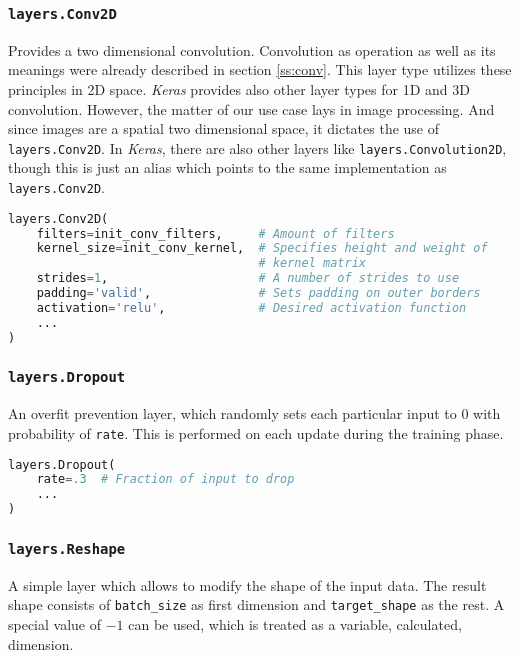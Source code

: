 \subsubsection{\texttt{layers.Conv2D}}

Provides a two dimensional convolution. Convolution as operation as well as its meanings were already described in section \ref{ss:conv}. This layer type utilizes these principles in 2D space. \textit{Keras} provides also other layer types for 1D and 3D convolution. However, the matter of our use case lays in image processing. And since images are a spatial two dimensional space, it dictates the use of \texttt{layers.Conv2D}. In \textit{Keras}, there are also other layers like \texttt{layers.Convolution2D}, though this is just an alias which points to the same implementation as \texttt{layers.Conv2D}.

\begin{lstlisting}[language=Python, caption=2D convolution layer]
layers.Conv2D(
    filters=init_conv_filters,     # Amount of filters
    kernel_size=init_conv_kernel,  # Specifies height and weight of
                                   # kernel matrix
    strides=1,                     # A number of strides to use
    padding='valid',               # Sets padding on outer borders
    activation='relu',             # Desired activation function
    ...
)
\end{lstlisting}

\subsubsection{\texttt{layers.Dropout}}

An overfit prevention layer, which randomly sets each particular input to 0 with probability of \texttt{rate}. This is performed on each update during the training phase.


\begin{lstlisting}[language=Python, caption=Dropout layer]
layers.Dropout(
    rate=.3  # Fraction of input to drop
    ...
)
\end{lstlisting}

\subsubsection{\texttt{layers.Reshape}}

A simple layer which allows to modify the shape of the input data. The result shape consists of \texttt{batch\_size} as first dimension and \texttt{target\_shape} as the rest. A special value of $-1$ can be used, which is treated as a variable, calculated, dimension.


